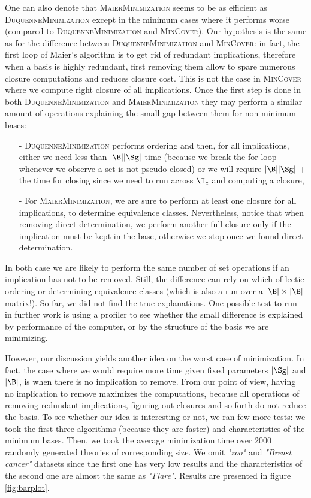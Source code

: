 One can also denote that \textsc{MaierMinimization} seems to be as efficient as \textsc{DuquenneMinimization} except in the minimum cases where it performs worse (compared to \textsc{DuquenneMinimization} and \textsc{MinCover}). Our hypothesis is the same as for the difference between \textsc{DuquenneMinimization} and \textsc{MinCover}: in fact, the first loop of Maier's algorithm is to get rid of redundant implications, therefore when a 
basis is highly redundant, first removing them allow to spare numerous closure
computations and reduces closure cost. This is not the case in \textsc{MinCover}
where we compute right closure of all implications. Once the first step is done
in both \textsc{DuquenneMinimization} and \textsc{MaierMinimization} they may perform a similar amount of operations explaining the small gap between them for
non-minimum bases:
\begin{itemize}
	\item[-] \textsc{DuquenneMinimization} performs ordering and then, for 
	all implications, either we need less than $|\B||\Sg|$ time (because we break the for loop whenever we observe a set is not pseudo-closed) or we
	will require $|\B||\Sg|$ + the time for closing since we need to run across $\I_c$ and computing a closure, 
	\item[-] For \textsc{MaierMinimization}, we are sure to perform at least
	one closure for all implications, to determine equivalence classes. Nevertheless, notice that when removing direct determination, we perform 
	another full closure only if the implication must be kept in the base,
	otherwise we stop once we found direct determination.
\end{itemize}
\noindent In both case we are likely to perform the same number of set operations if an implication has not to be removed. Still, the difference
can rely on which of lectic ordering or determining equivalence classes (which is also a run over a $|\B|\times|\B|$ matrix!). So far, we did not find 
the true explanations. One possible test to run in further work is using a profiler to see whether the small difference is explained by performance of 
the computer, or by the structure of the basis we are minimizing.

\vspace{1.2em}

However, our discussion yields another idea on the worst case of minimization. In fact, the case where we would require more time given fixed parameters $|\Sg|$ and $|\B|$, is when there is no implication to remove. From our point of view, having no implication to remove maximizes the computations, because all operations of removing redundant implications, figuring out closures and so forth do not reduce the basis. To see whether our idea is interesting or not, we ran few more tests: we took the first three algorithms (because they are faster) and characteristics of the minimum bases. Then, we took the average
minimization time over 2000 randomly generated theories of corresponding size.
We omit \textit{"zoo"} and \textit{"Breast cancer"} datasets since the first one has very low results and the characteristics of the second one are almost
the same as \textit{"Flare"}. Results are presented in figure \ref{fig:barplot}.

